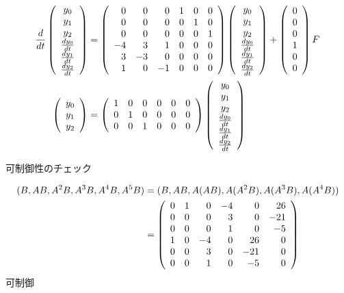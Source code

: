 \begin{align}
 \frac{d}{dt} \statev
 &= \matA \statev + \matB F
\nonumber
\\
 \left(\begin{array}{c}
	    y_0 \\
		y_1 \\
		y_2
       \end{array}\right)
 &=
 \left(\begin{array}{rrrrrr}
         1 & 0 & 0 & 0 & 0 & 0  \\
         0 & 1 & 0 & 0 & 0 & 0 \\
         0 & 0 & 1 & 0 & 0 & 0 \\
       \end{array}\right)
 \statev
\nonumber
\end{align}

可制御性のチェック

\begin{align}
 (B,AB, A^2B, A^3B, A^4B, A^5B)
 &=
 (B,AB, A(AB), A(A^2B), A(A^3B), A(A^4B))
\nonumber \\
 &=
 \matCo
\nonumber
\end{align}
可制御





